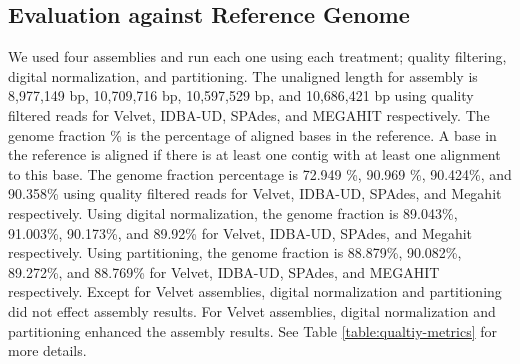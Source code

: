 



\subsection*{Evaluation against Reference Genome}   

We used four assemblies and run each one using each treatment; quality
filtering, digital normalization, and partitioning.  The unaligned
length for assembly is 8,977,149 bp, 10,709,716 bp, 10,597,529 bp, and
10,686,421 bp using quality filtered reads for Velvet, IDBA-UD, SPAdes,
and MEGAHIT respectively.  The genome fraction \% is the percentage of
aligned bases in the reference. A base in the reference is aligned if
there is at least one contig with at least one alignment to this base.
The genome fraction percentage is 72.949 \%, 90.969 \%, 90.424\%, and
90.358\% using quality filtered reads for Velvet, IDBA-UD, SPAdes, and
Megahit respectively.  Using digital normalization, the genome
fraction is 89.043\%, 91.003\%, 90.173\%, and 89.92\% for Velvet,
IDBA-UD, SPAdes, and Megahit respectively.  Using partitioning, the
genome fraction is 88.879\%, 90.082\%, 89.272\%, and 88.769\% for
Velvet, IDBA-UD, SPAdes, and MEGAHIT respectively.  Except for Velvet assemblies, digital
normalization and partitioning did not effect assembly results. For Velvet assemblies, digital normalization and partitioning enhanced the assembly results. See
Table \ref{table:qualtiy-metrics} for more details.

